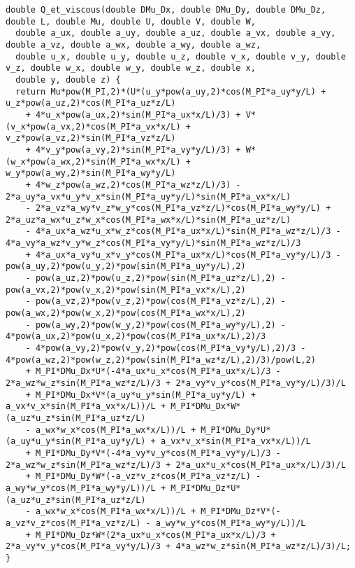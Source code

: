 \documentclass[10pt]{article}
\begin{document}
\begin{footnotesize}
\begin{verbatim}
double Q_et_viscous(double DMu_Dx, double DMu_Dy, double DMu_Dz, double L, double Mu, double U, double V, double W, 
  double a_ux, double a_uy, double a_uz, double a_vx, double a_vy, double a_vz, double a_wx, double a_wy, double a_wz, 
  double u_x, double u_y, double u_z, double v_x, double v_y, double v_z, double w_x, double w_y, double w_z, double x, 
  double y, double z) {
  return Mu*pow(M_PI,2)*(U*(u_y*pow(a_uy,2)*cos(M_PI*a_uy*y/L) + u_z*pow(a_uz,2)*cos(M_PI*a_uz*z/L) 
	+ 4*u_x*pow(a_ux,2)*sin(M_PI*a_ux*x/L)/3) + V*(v_x*pow(a_vx,2)*cos(M_PI*a_vx*x/L) + v_z*pow(a_vz,2)*sin(M_PI*a_vz*z/L) 
	+ 4*v_y*pow(a_vy,2)*sin(M_PI*a_vy*y/L)/3) + W*(w_x*pow(a_wx,2)*sin(M_PI*a_wx*x/L) + w_y*pow(a_wy,2)*sin(M_PI*a_wy*y/L) 
	+ 4*w_z*pow(a_wz,2)*cos(M_PI*a_wz*z/L)/3) - 2*a_uy*a_vx*u_y*v_x*sin(M_PI*a_uy*y/L)*sin(M_PI*a_vx*x/L) 
	- 2*a_vz*a_wy*v_z*w_y*cos(M_PI*a_vz*z/L)*cos(M_PI*a_wy*y/L) + 2*a_uz*a_wx*u_z*w_x*cos(M_PI*a_wx*x/L)*sin(M_PI*a_uz*z/L) 
	- 4*a_ux*a_wz*u_x*w_z*cos(M_PI*a_ux*x/L)*sin(M_PI*a_wz*z/L)/3 - 4*a_vy*a_wz*v_y*w_z*cos(M_PI*a_vy*y/L)*sin(M_PI*a_wz*z/L)/3 
	+ 4*a_ux*a_vy*u_x*v_y*cos(M_PI*a_ux*x/L)*cos(M_PI*a_vy*y/L)/3 - pow(a_uy,2)*pow(u_y,2)*pow(sin(M_PI*a_uy*y/L),2) 
	- pow(a_uz,2)*pow(u_z,2)*pow(sin(M_PI*a_uz*z/L),2) - pow(a_vx,2)*pow(v_x,2)*pow(sin(M_PI*a_vx*x/L),2) 
	- pow(a_vz,2)*pow(v_z,2)*pow(cos(M_PI*a_vz*z/L),2) - pow(a_wx,2)*pow(w_x,2)*pow(cos(M_PI*a_wx*x/L),2) 
	- pow(a_wy,2)*pow(w_y,2)*pow(cos(M_PI*a_wy*y/L),2) - 4*pow(a_ux,2)*pow(u_x,2)*pow(cos(M_PI*a_ux*x/L),2)/3 
	- 4*pow(a_vy,2)*pow(v_y,2)*pow(cos(M_PI*a_vy*y/L),2)/3 - 4*pow(a_wz,2)*pow(w_z,2)*pow(sin(M_PI*a_wz*z/L),2)/3)/pow(L,2) 
	+ M_PI*DMu_Dx*U*(-4*a_ux*u_x*cos(M_PI*a_ux*x/L)/3 - 2*a_wz*w_z*sin(M_PI*a_wz*z/L)/3 + 2*a_vy*v_y*cos(M_PI*a_vy*y/L)/3)/L 
	+ M_PI*DMu_Dx*V*(a_uy*u_y*sin(M_PI*a_uy*y/L) + a_vx*v_x*sin(M_PI*a_vx*x/L))/L + M_PI*DMu_Dx*W*(a_uz*u_z*sin(M_PI*a_uz*z/L) 
	- a_wx*w_x*cos(M_PI*a_wx*x/L))/L + M_PI*DMu_Dy*U*(a_uy*u_y*sin(M_PI*a_uy*y/L) + a_vx*v_x*sin(M_PI*a_vx*x/L))/L 
	+ M_PI*DMu_Dy*V*(-4*a_vy*v_y*cos(M_PI*a_vy*y/L)/3 - 2*a_wz*w_z*sin(M_PI*a_wz*z/L)/3 + 2*a_ux*u_x*cos(M_PI*a_ux*x/L)/3)/L 
	+ M_PI*DMu_Dy*W*(-a_vz*v_z*cos(M_PI*a_vz*z/L) - a_wy*w_y*cos(M_PI*a_wy*y/L))/L + M_PI*DMu_Dz*U*(a_uz*u_z*sin(M_PI*a_uz*z/L) 
	- a_wx*w_x*cos(M_PI*a_wx*x/L))/L + M_PI*DMu_Dz*V*(-a_vz*v_z*cos(M_PI*a_vz*z/L) - a_wy*w_y*cos(M_PI*a_wy*y/L))/L 
	+ M_PI*DMu_Dz*W*(2*a_ux*u_x*cos(M_PI*a_ux*x/L)/3 + 2*a_vy*v_y*cos(M_PI*a_vy*y/L)/3 + 4*a_wz*w_z*sin(M_PI*a_wz*z/L)/3)/L;
}


\end{verbatim}
\end{footnotesize}
\end{document}

